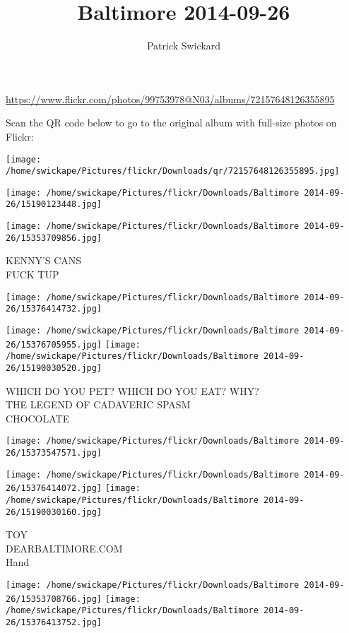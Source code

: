 \documentclass[10pt,letterpaper]{article}
\title{Baltimore 2014-09-26}
\author{Patrick Swickard}
\date{}
\begin{document}
\maketitle

\url{https://www.flickr.com/photos/99753978@N03/albums/72157648126355895}

Scan the QR code below to go to the original album with full-size photos on Flickr:

\texttt{[image: /home/swickape/Pictures/flickr/Downloads/qr/72157648126355895.jpg]}
\pagebreak

\texttt{[image: /home/swickape/Pictures/flickr/Downloads/Baltimore 2014-09-26/15190123448.jpg]}

\vspace{0.25in}
\texttt{[image: /home/swickape/Pictures/flickr/Downloads/Baltimore 2014-09-26/15353709856.jpg]}

KENNY'S CANS\\
FUCK TUP
\pagebreak

\texttt{[image: /home/swickape/Pictures/flickr/Downloads/Baltimore 2014-09-26/15376414732.jpg]}

\vspace{0.25in}
\texttt{[image: /home/swickape/Pictures/flickr/Downloads/Baltimore 2014-09-26/15376705955.jpg]}
\texttt{[image: /home/swickape/Pictures/flickr/Downloads/Baltimore 2014-09-26/15190030520.jpg]}

WHICH DO YOU PET?  WHICH DO YOU EAT?  WHY?\\
THE LEGEND OF CADAVERIC SPASM\\
CHOCOLATE
\pagebreak

\texttt{[image: /home/swickape/Pictures/flickr/Downloads/Baltimore 2014-09-26/15373547571.jpg]}

\vspace{0.25in}
\texttt{[image: /home/swickape/Pictures/flickr/Downloads/Baltimore 2014-09-26/15376414072.jpg]}
\texttt{[image: /home/swickape/Pictures/flickr/Downloads/Baltimore 2014-09-26/15190030160.jpg]}

TOY\\
DEARBALTIMORE.COM\\
Hand
\pagebreak

\texttt{[image: /home/swickape/Pictures/flickr/Downloads/Baltimore 2014-09-26/15353708766.jpg]}
\texttt{[image: /home/swickape/Pictures/flickr/Downloads/Baltimore 2014-09-26/15376413752.jpg]}
\end{document}
